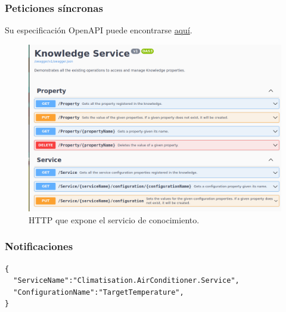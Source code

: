 \subsubsection{Peticiones síncronas}

Su especificación OpenAPI puede encontrarse \href{https://github.com/Starkie/TFM-DistributedAutoadaptiveSystems/blob/1db95346290cb55edbfd5efb717785bcd06def79/src/AutoAdaptativeSystem/AdaptionLoop/Knowledge/Knowledge.Service-OpenAPISpec.json}{aquí}.

\begin{figure}[h!]
  \hspace{-0.25cm}
  \includegraphics[scale=0.45]{anx_apis/images/apis-knowledge}
  \caption{ HTTP que expone el servicio de conocimiento.}
\end{figure}

\subsubsection{Notificaciones}

\newsavebox\configurationchangedeventbox
\begin{lrbox}{\configurationchangedeventbox}
  \begin{minipage}[t]{2in}
    \begin{verbatim}
{
  "ServiceName":"Climatisation.AirConditioner.Service",
  "ConfigurationName":"TargetTemperature",
}
        \end{verbatim}
  \end{minipage}
\end{lrbox}

